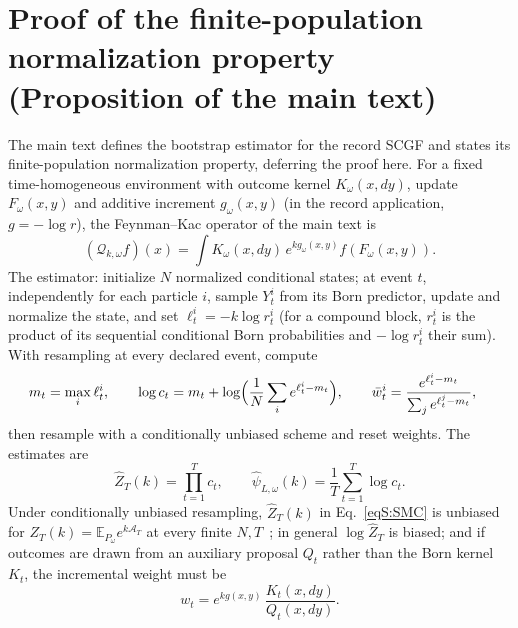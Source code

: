 \documentclass[aps,prx,reprint,superscriptaddress,nobibnotes,longbibliography]{revtex4-2}
\newcommand{\E}{\mathbb E}
\begin{document}
\section{Proof of the finite-population normalization property
(Proposition of the main text)}
\label{sm:smcproof}

The main text defines the bootstrap estimator for the record SCGF and
states its finite-population normalization property, deferring the proof
here.  For a fixed time-homogeneous environment with outcome kernel
$K_\omega(x,dy)$, update $F_\omega(x,y)$ and additive increment
$g_\omega(x,y)$ (in the record application, $g=-\log r$), the
Feynman--Kac operator of the main text is
\begin{equation}
 (\mathcal Q_{k,\omega}f)(x)=\int K_\omega(x,dy)\,
 e^{kg_\omega(x,y)}f(F_\omega(x,y)).
 \label{eqS:FK}
\end{equation}
The estimator: initialize $N$ normalized conditional states; at event
$t$, independently for each particle $i$, sample $Y_t^i$ from its Born
predictor, update and normalize the state, and set
$\ell_t^i=-k\log r_t^i$ (for a compound block, $r_t^i$ is the product of
its sequential conditional Born probabilities and $-\log r_t^i$ their
sum).  With resampling at every declared event, compute
\begin{align}
 m_t&=\max_i\ell_t^i,\qquad
 \log c_t=m_t+\log\Bigl(\frac1N\sum_i e^{\ell_t^i-m_t}\Bigr),\qquad
 \bar w_t^i=\frac{e^{\ell_t^i-m_t}}{\sum_j e^{\ell_t^j-m_t}},\nonumber
\end{align}
then resample with a conditionally unbiased scheme and reset weights.
The estimates are
\begin{equation}
 \widehat Z_T(k)=\prod_{t=1}^Tc_t,\qquad
 \widehat\psi_{L,\omega}(k)=\frac1T\sum_{t=1}^T\log c_t.
 \label{eqS:SMC}
\end{equation}
Under conditionally unbiased resampling, $\widehat Z_T(k)$ in
Eq.~\eqref{eqS:SMC} is unbiased for $Z_T(k)=\E_{P_\omega}e^{k\mathcal A_T}$
at every finite $N,T$~\cite{DelMoral2004}; in general
$\log\widehat Z_T$ is biased; and if outcomes are drawn from an auxiliary
proposal $Q_t$ rather than the Born kernel $K_t$, the incremental weight
must be
\begin{equation}
 w_t=e^{kg(x,y)}\,\frac{K_t(x,dy)}{Q_t(x,dy)}.
 \label{eqS:RN}
\end{equation}
\end{document}
